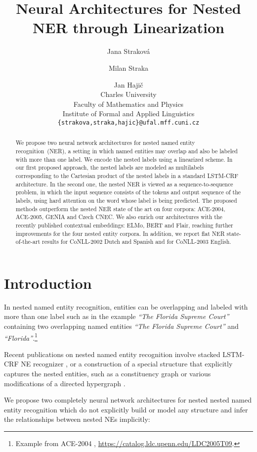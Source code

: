 \documentclass[11pt,a4paper]{article}
\title{Neural Architectures for Nested NER through Linearization}
\author{Jana Strakov\'{a} \and Milan Straka \and Jan Haji\v{c}\\
  Charles University \\
  Faculty of Mathematics and Physics \\
  Institute of Formal and Applied Linguistics \\
  {\tt \{strakova,straka,hajic\}@ufal.mff.cuni.cz} \\}
\date{}
\begin{document}
\maketitle

\begin{abstract}
  We propose two neural network architectures for nested named entity recognition~(NER), a setting in which named entities may overlap and also be labeled with more than one label. We encode the nested labels using a linearized scheme. In our first proposed approach, the nested labels are modeled as multilabels corresponding to the Cartesian product of the nested labels in a standard LSTM-CRF architecture. In the second one, the nested NER is viewed as a sequence-to-sequence problem, in which the input sequence consists of the tokens and output sequence of the labels, using hard attention on the word whose label is being predicted. The proposed methods outperform the nested NER state of the art on four corpora: ACE-2004, ACE-2005, GENIA and Czech CNEC.  We also enrich our architectures with the recently published contextual embeddings: ELMo, BERT and Flair, reaching further improvements for the four nested entity corpora. In addition, we report flat NER state-of-the-art results for CoNLL-2002 Dutch and Spanish and for CoNLL-2003 English.
\end{abstract}

\section{Introduction}
\label{section:introduction}

In nested named entity recognition, entities can be overlapping and
labeled with more than one label such as in the example \textit{``The Florida
Supreme Court''} containing two overlapping named entities \textit{``The
Florida Supreme Court''} and \textit{``Florida''}.\footnote{Example from
ACE-2004 \cite{Doddington}, \url{https://catalog.ldc.upenn.edu/LDC2005T09}.}

Recent publications on nested named entity recognition involve stacked LSTM-CRF
NE recognizer \cite{Ju2018}, or a construction of a special structure that
explicitly captures the nested entities, such as a constituency graph
\cite{Finkel2009} or various modifications of a directed hypergraph
\cite{Lu2015,Katiyar2018,Wang2018}.

We propose two completely neural network architectures for nested nested named
entity recognition which do not explicitly build or model any structure and
infer the relationships between nested NEs implicitly:
\end{document}
